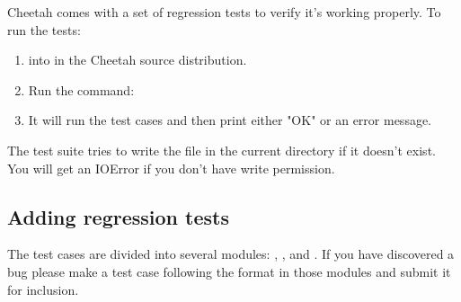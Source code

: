 Cheetah comes with a set of regression tests to verify it's working properly.
To run the tests:

\begin{enumerate}
     
\item {} into  in the Cheetah source distribution.
     
\item Run the command: 
     
\item It will run the test cases and then print either "OK" or an error message.

\end{enumerate}

The test suite tries to write the file  in the current
directory if it doesn't exist.  You will get an IOError if you don't have write
permission.

\subsection{Adding regression tests}

The test cases are divided into several modules:
, , and
. If you have discovered a bug please make a test
case following the format in those modules and submit it for inclusion.

